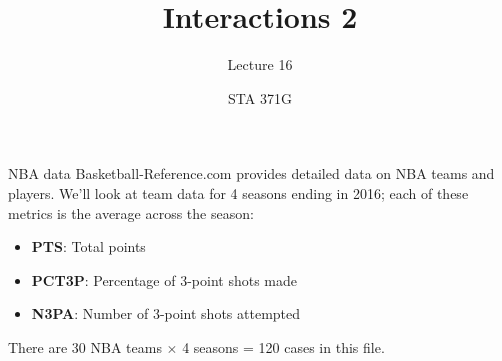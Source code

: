 \documentclass{beamer}\usepackage[]{graphicx}\usepackage[]{color}
\title{Interactions 2}
\subtitle{Lecture 16}
\author{STA 371G}
\begin{document}
  
  

  \frame{\maketitle}



  \begin{darkframes}

    \begin{frame}{NBA data}
      Basketball-Reference.com provides detailed data on NBA teams and players. We'll look at team data for 4 seasons ending in 2016; each of these metrics is the average across the season:
      \begin{itemize}
        \item \textbf{PTS}: Total points
        \item \textbf{PCT3P}: Percentage of 3-point shots made
        \item \textbf{N3PA}: Number of 3-point shots attempted
      \end{itemize}
      There are 30 NBA teams $\times$ 4 seasons = 120 cases in this file.
    \end{frame}


\end{darkframes}
\end{document}
